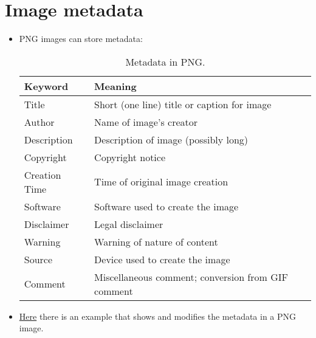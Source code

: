 \section{Image metadata}
\begin{itemize}
\item \gls{PNG} images can store metadata:
  \begin{table}[!h]
    \vspace{2ex}
    \begin{center}
      \begin{tabular}{l|l}
        Keyword & Meaning\\
        \hline
        Title & Short (one line) title or caption for image \\
        Author & Name of image's creator \\
        Description & Description of image (possibly long) \\
        Copyright & Copyright notice \\
        Creation Time & Time of original image creation \\
        Software & Software used to create the image \\
        Disclaimer & Legal disclaimer \\
        Warning & Warning of nature of content \\
        Source & Device used to create the image \\
        Comment & Miscellaneous comment; conversion from GIF comment
      \end{tabular}
    \end{center}
    \caption{Metadata in PNG.}
    \label{tab:meta_PNG}
  \end{table}
\end{itemize}

\begin{itemize}
\item
  \href{https://github.com/vicente-gonzalez-ruiz/medical_imaging/blob/main/notebooks/PNG_add_metadata.ipynb}{Here}
  there is an example that shows and modifies the metadata in a PNG
  image.
\end{itemize}

